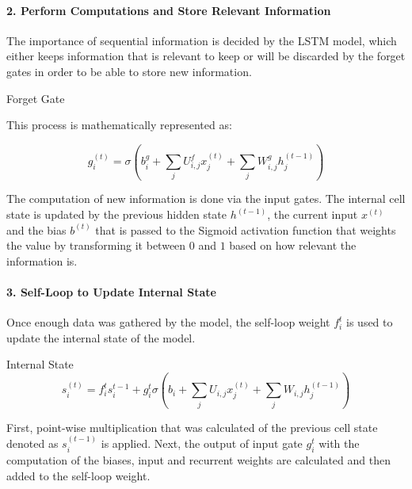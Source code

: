         \paragraph{2. Perform Computations and Store Relevant Information}

            The importance of sequential information is decided by the LSTM model, which either keeps information that is relevant to keep or will be discarded by the forget gates in order to be able to store new information.
            
            \begin{pabox}{Forget Gate}

                This process is mathematically represented as:

                $$g_i^{(t)} = \sigma \left(b_i^g + \sum_{j} U_{i, j}^f x_j^{(t)} + \sum_{j} W_{i, j}^g h_j^{(t - 1)}\right)$$

                The computation of new information is done via the input gates. The internal cell state is updated by the previous hidden state $h^{(t - 1)}$, the current input $x^{(t)}$ and the bias $b^{(t)}$ that is passed to the Sigmoid activation function that weights the value by transforming it between $0$ and $1$ based on how relevant the information is.
                
            \end{pabox}

        


        \paragraph{3. Self-Loop to Update Internal State}
        \label{par:self-loop-to-update-internal-state}

            Once enough data was gathered by the model, the self-loop weight $f_i^t$ is used to update the internal state of the model.

            \begin{pabox}{Internal State}
                $$s_i^{(t)} = f_i^t s_i^{t - 1} + g_i^t \sigma \left(b_i + \sum_{j} U_{i, j} x_j^{(t)} + \sum_{j} W_{i, j} h_j^{(t - 1)}\right)$$
            \end{pabox}
            First, point-wise multiplication that was calculated of the previous cell state denoted as $s_i^{(t - 1)}$  is applied. Next, the output of input gate $g_i^t$ with the computation of the biases, input and recurrent weights are calculated and then added to the self-loop weight.

